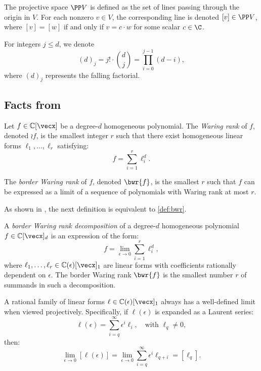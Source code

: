\documentclass{article}
\begin{document}
The projective space $\PP V$ is defined as the set of lines passing through the origin in $V$. For each nonzero $v \in V$, the corresponding line is denoted $[v] \in \PP V$, where $[v] = [w]$ if and only if $v = c\cdot w$ for some scalar $c\in \C$.

For integers $j \leq d$, we denote 
\[(d)_j=j!\cdot \binom{d}{j}=\prod_{i=0}^{j-1}(d-i),\]
where $(d)_j$ represents the falling factorial.




\subsection{Facts from \cite{DuttaGIJL24}}\label{sec:facts}



\begin{definition}\label{def:wr}
    Let \( f \in \mathbb{C}[\vecx] \) be a degree-\( d \) homogeneous polynomial.
    The \emph{Waring rank} of \( f \), denoted \( \wr{f} \), is the smallest integer \( r \) such that there exist homogeneous linear forms \( \ell_1, \ldots, \ell_r \) satisfying:
    \[
    f = \sum_{i=1}^{r} \ell_i^d.
    \]
\end{definition}

\begin{definition}\label{def:bwr}
    The \emph{border Waring rank} of \( f \), denoted \( \bwr{f} \), is the smallest \( r \) such that \( f \) can be expressed as a limit of a sequence of polynomials with Waring rank at most \( r \). 
\end{definition}


As shown in \cite{Alder84}, the next definition is equivalent to \autoref{def:bwr}. 

\begin{definition}\label{def:bwr-alder}
    A \emph{border Waring rank decomposition} of a degree-\( d \) homogeneous polynomial \( f \in \mathbb{C}[\vecx]_d \) is an expression of the form:
    \[
    f = \lim_{\epsilon \to 0} \sum_{i=1}^{r} \ell_i^d,
    \]
    where \( \ell_1, \ldots, \ell_r \in \mathbb{C}(\epsilon)[\vecx]_1 \) are linear forms with coefficients rationally dependent on \( \epsilon \). The border Waring rank \( \bwr{f} \) is the smallest number \( r \) of summands in such a decomposition.
\end{definition}




A rational family of linear forms \( \ell \in \mathbb{C}(\epsilon)[\vecx]_1 \) always has a well-defined limit when viewed projectively.
Specifically, if \( \ell(\epsilon) \) is expanded as a Laurent series:
\[
\ell(\epsilon) = \sum_{i=q}^{\infty} \epsilon^i \ell_i, \quad \text{with } \ell_q \neq 0,
\]
then:
\begin{equation}\label{eq:local}
\lim_{\epsilon\to 0}[\ell(\epsilon)] = \lim_{\epsilon\to 0}\sum_{i=q}^{\infty}\epsilon^i \ell_{q+i} = [\ell_q].   
\end{equation}
\end{document}
